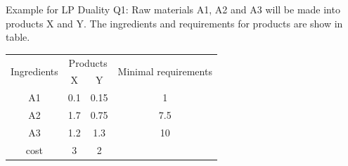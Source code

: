 \documentclass[12pt,notes,mathserif]{beamer}
\begin{document}
\begin{frame}
	{Example for LP Duality}
	Q1: Raw materials A1, A2 and A3 will be made into products X and Y. The ingredients and requirements for products are show in table.
	\begin{table}
		\begin{tabular}{cccc}
			\hline
			\multirow{2}{*}{Ingredients} & \multicolumn{2}{c}{Products} & \multirow{2}{*}{Minimal requirements}       \\ \cline{2-3}
			                             & X                            & Y                                     &     \\  \hline \hline
			A1                           & 0.1                          & 0.15                                  & 1   \\
			A2                           & 1.7                          & 0.75                                  & 7.5 \\
			A3                           & 1.2                          & 1.3                                   & 10  \\ \hline
			cost                         & 3                            & 2                                     &     \\ \hline
		\end{tabular}
	\end{table}

\end{frame}
\end{document}
